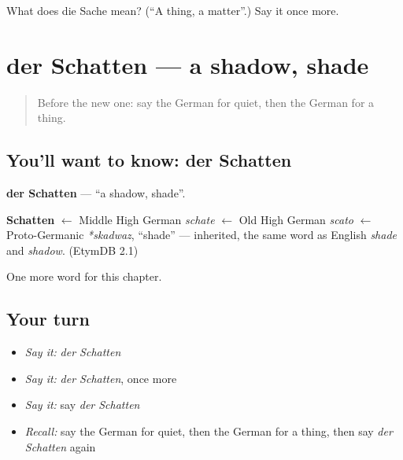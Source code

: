 \begin{tcolorbox}[breakable,colback=teal!4,colframe=teal!35!black,title={Before you move on}]
What does die Sache mean? (\textquotedblleft{}A thing, a matter\textquotedblright{}.) Say it once more.
\end{tcolorbox}
\section[der Schatten]{der Schatten — a shadow, shade}

\label{lesson:GE-C237-schatten}



\begin{quote}
Before the new one: say the German for quiet, then the German for a thing.
\end{quote}

\subsection*{You'll want to know: der Schatten}
\textbf{der Schatten} — \textquotedblleft{}a shadow, shade\textquotedblright{}.

\begin{cousinweb}
\textbf{Schatten} $\leftarrow$ Middle High German \emph{schate} $\leftarrow$ Old High German \emph{scato} $\leftarrow$ Proto-Germanic \emph{*skadwaz}, \textquotedblleft{}shade\textquotedblright{} — inherited, the same word as English \emph{shade} and \emph{shadow}. (EtymDB 2.1)
\end{cousinweb}

\begin{grammarlens}[title={What you've built}]
One more word for this chapter.
\end{grammarlens}

\subsection*{Your turn}
\begin{itemize}
\raggedright
  \item \emph{Say it:} \emph{der Schatten}
  \item \emph{Say it:} \emph{der Schatten}, once more
  \item \emph{Say it:} say \emph{der Schatten}
  \item \emph{Recall:} say the German for quiet, then the German for a thing, then say \emph{der Schatten} again
\end{itemize}

